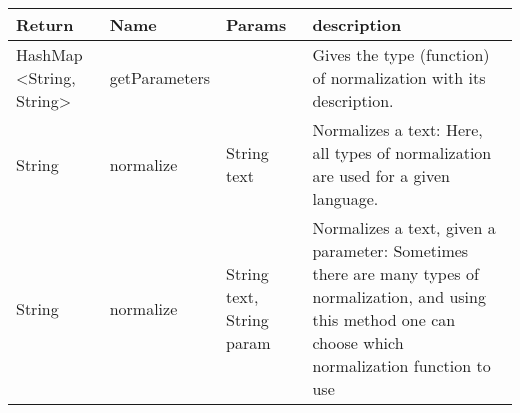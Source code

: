\begin{tabular}{p{}p{}p{}p{}} 
	\hline \hline
	
	Return & Name & Params & description \\
	
	\hline\hline
	
	HashMap <String, String> & getParameters && 
	Gives the type (function) of normalization with its description. \\
	
	\hline
	
	String & normalize & String text &
	Normalizes a text: Here, all types of normalization are used for a given language.  \\
	
	\hline
	
	String & normalize & String text, String param & 
	Normalizes a text, given a parameter: Sometimes there are many types of normalization, and using this method one can choose which normalization function to use  \\
	
	\hline \hline
\end{tabular}